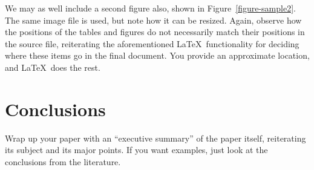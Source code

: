 \documentclass{article}
\begin{document}
We may as well include a second figure also, shown in Figure~\ref{figure-sample2}.  The same image file is used, but note how it can be resized.  Again, observe how the positions of the tables and figures do not necessarily match their positions in the source file, reiterating the aforementioned \LaTeX\ functionality for deciding where these items go in the final document.  You provide an approximate location, and \LaTeX\ does the rest.


\section{Conclusions}


Wrap up your paper with an ``executive summary'' of the paper itself, reiterating its subject and its major points.  If you want examples, just look at the conclusions from the literature.
\clearpage


{}

\end{document}
